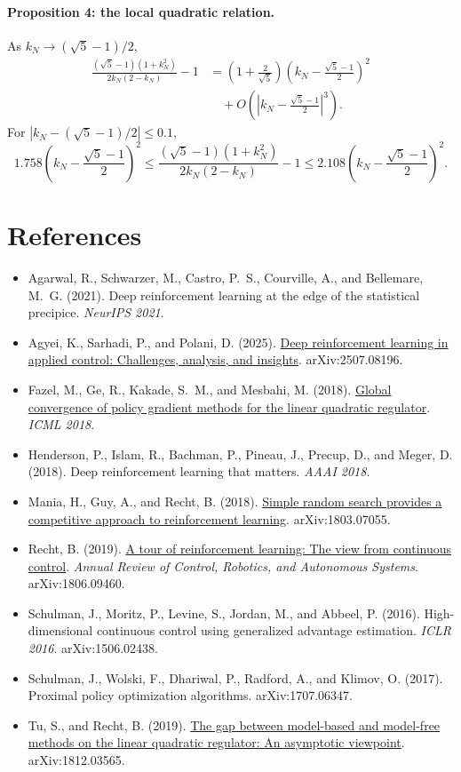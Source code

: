 \documentclass[11pt]{article}
\begin{document}
\paragraph{Proposition 4: the local quadratic relation.}
As $k_N\to(\sqrt{5}-1)/2$,
\begin{align*}
  \frac{(\sqrt{5}-1)(1+k_N^2)}{2k_N(2-k_N)}-1
  &=\left(1+\frac{2}{\sqrt{5}}\right)
      \left(k_N-\frac{\sqrt{5}-1}{2}\right)^2 \\
  &\quad+O\!\left(\left|k_N-\frac{\sqrt{5}-1}{2}\right|^3\right).
\end{align*}
For $\left|k_N-(\sqrt{5}-1)/2\right|\le0.1$,
\[
  1.758\left(k_N-\frac{\sqrt{5}-1}{2}\right)^2
  \le \frac{(\sqrt{5}-1)(1+k_N^2)}{2k_N(2-k_N)}-1
  \le 2.108\left(k_N-\frac{\sqrt{5}-1}{2}\right)^2 .
\]

\section*{References}

\begin{itemize}
  \item Agarwal, R., Schwarzer, M., Castro, P.~S., Courville, A., and Bellemare, M.~G. (2021). Deep
    reinforcement learning at the edge of the statistical precipice. \emph{NeurIPS 2021}.
  \item Agyei, K., Sarhadi, P., and Polani, D. (2025).
    \href{https://arxiv.org/html/2507.08196}{Deep reinforcement learning in applied control:
    Challenges, analysis, and insights}. arXiv:2507.08196.
  \item Fazel, M., Ge, R., Kakade, S.~M., and Mesbahi, M. (2018).
    \href{https://proceedings.mlr.press/v80/fazel18a.html}{Global convergence of policy gradient
    methods for the linear quadratic regulator}. \emph{ICML 2018}.
  \item Henderson, P., Islam, R., Bachman, P., Pineau, J., Precup, D., and Meger, D. (2018). Deep
    reinforcement learning that matters. \emph{AAAI 2018}.
  \item Mania, H., Guy, A., and Recht, B. (2018).
    \href{https://arxiv.org/pdf/1803.07055}{Simple random search provides a competitive approach to
    reinforcement learning}. arXiv:1803.07055.
  \item Recht, B. (2019). \href{https://arxiv.org/pdf/1806.09460}{A tour of reinforcement learning:
    The view from continuous control}. \emph{Annual Review of Control, Robotics, and Autonomous
    Systems}. arXiv:1806.09460.
  \item Schulman, J., Moritz, P., Levine, S., Jordan, M., and Abbeel, P. (2016). High-dimensional
    continuous control using generalized advantage estimation. \emph{ICLR 2016}. arXiv:1506.02438.
  \item Schulman, J., Wolski, F., Dhariwal, P., Radford, A., and Klimov, O. (2017). Proximal policy
    optimization algorithms. arXiv:1707.06347.
  \item Tu, S., and Recht, B. (2019). \href{https://arxiv.org/pdf/1812.03565}{The gap between
    model-based and model-free methods on the linear quadratic regulator: An asymptotic viewpoint}.
    arXiv:1812.03565.
\end{itemize}
\end{document}
